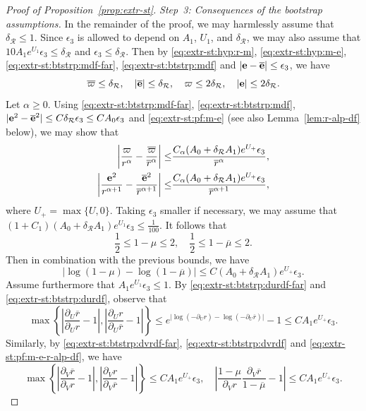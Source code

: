 \documentclass[10pt, reqno]{amsart}
\theoremstyle{definition}
\theoremstyle{remark}
\theoremstyle{conjecture}
\numberwithin{equation}{section}
\newcommand{\abs}[1]{\vert#1\vert}
\newcommand{\set}[1]{\{#1\}}
\newcommand{\rd}{\partial}
\newcommand{\0}{\emptyset}
\newcommand{\alp}{\alpha}
\newcommand{\dlt}{\delta}
\newcommand{\eps}{\epsilon}
\newcommand{\bfe}{{\bf e}}
\newcommand{\calR}{\mathcal R}
\newcommand{\pfstep}[1]{\vspace{.5em} {\it \noindent #1.}}
\newcommand{\e}{\bfe}							%
\newcommand{\rbg}{\overline{r}}					%
\newcommand{\varpibg}{\overline{\varpi}}				%
\newcommand{\mubg}{\overline{\mu}}				%
\newcommand{\ebg}{\overline{\e}}					%
\newcommand{\Abs}[1]{\left\vert #1 \right\vert}
\begin{document}
\begin{proof}[Proof of Proposition~\ref{prop:extr-st}]
\pfstep{Step~3: Consequences of the bootstrap assumptions}
In the remainder of the proof, we may harmlessly assume that $\dlt_{\calR} \leq 1$. Since $\eps_{3}$ is allowed to depend on $A_{1}$, $U_{1}$, and $\dlt_{\calR}$, we may also assume that $10 A_{1} e^{U_{1}} \eps_{3} \leq \dlt_{\calR}$ and $\eps_{3} \leq \dlt_{\calR}$. Then by \eqref{eq:extr-st:hyp:r-m}, \eqref{eq:extr-st:hyp:m-e}, \eqref{eq:extr-st:btstrp:mdf-far}, \eqref{eq:extr-st:btstrp:mdf} and $\abs{\e - \ebg} \leq \eps_{3}$, we have
\begin{equation} \label{eq:extr-st:pf:m-e}
	\varpibg \leq \dlt_{\calR}, \quad
	|\ebg| \leq \dlt_{\calR}, \quad
	\varpi \leq 2 \dlt_{\calR}, \quad
	|\e| \leq 2 \dlt_{\calR}.
\end{equation}
Let $\alp \geq 0$. Using \eqref{eq:extr-st:btstrp:mdf-far}, \eqref{eq:extr-st:btstrp:mdf}, $\abs{\e^{2} - \ebg^{2}} \leq C \dlt_{\calR} \eps_{3} \leq C A_{0} \eps_{3}$ and \eqref{eq:extr-st:pf:m-e} (see also Lemma~\ref{lem:r-alp-df} below), we may show that
\begin{align} \label{eq:extr-st:pf:m-e-r-alp-df}
	\Abs{\frac{\varpi}{r^{\alp}} - \frac{\varpibg}{\rbg^{\alp}}} \leq & \frac{C_{\alp} (A_{0} + \dlt_{\calR} A_{1}) e^{U_{+}}\eps_{3}}{\rbg^{\alp}}, \\
	\Abs{\frac{\e^{2}}{r^{\alp+1}} - \frac{\ebg^{2}}{\rbg^{\alp+1}}} \leq & \frac{C_{\alp} (A_{0} + \dlt_{\calR} A_{1}) e^{U_{+}}\eps_{3}}{\rbg^{\alp+1}},
\end{align}
where $U_{+} = \max \set{U, 0}$. Taking $\eps_{3}$ smaller if necessary, we may assume that $(1+C_{1}) (A_{0} + \dlt_{\calR} A_{1}) e^{U_{1}} \eps_{3} \leq \frac{1}{100}$. It follows that
\begin{equation} \label{eq:extr-st:pf:mu}
	\frac{1}{2} \leq 1-\mu \leq 2, \quad \frac{1}{2} \leq 1-\mubg \leq 2.
\end{equation}
Then in combination with the previous bounds, we have
\begin{equation} \label{eq:extr-st:pf:mu-df}
	\Abs{\log (1-\mu) - \log (1-\mubg)} \leq C (A_{0} + \dlt_{\calR} A_{1}) e^{U_{+}}\eps_{3}.
\end{equation}
Assume furthermore that $A_{1} e^{U_{1}} \eps_{3} \leq 1$. By \eqref{eq:extr-st:btstrp:durdf-far} and \eqref{eq:extr-st:btstrp:durdf}, observe that
\begin{equation} \label{eq:dur-df}
	\max \left\{ \Abs{\frac{\rd_{U} \rbg}{\rd_{U} r} - 1}, \Abs{\frac{\rd_{U} r}{\rd_{U} \rbg} - 1} \right\}
	\leq e^{\abs{\log (-\rd_{U} r) - \log(-\rd_{U} \rbg)}} - 1
	\leq C A_{1} e^{U_{+}} \eps_{3}.
\end{equation}
Similarly, by \eqref{eq:extr-st:btstrp:dvrdf-far}, \eqref{eq:extr-st:btstrp:dvrdf} and \eqref{eq:extr-st:pf:m-e-r-alp-df}, we have
\begin{equation} \label{eq:extr-st:pf:dvr-kpp-df}
\max \left\{ \Abs{\frac{\rd_{V} \rbg}{\rd_{V} r} - 1}, \Abs{\frac{\rd_{V} r}{\rd_{V} \rbg} - 1} \right\}
\leq C A_{1} e^{U_{+}} \eps_{3}, \quad
\Abs{\frac{1-\mu}{\rd_{V} r} \frac{\rd_{V} \rbg}{1-\mubg} - 1} 
\leq C A_{1} e^{U_{+}} \eps_{3}.
\end{equation}
 

\end{proof}
\end{document}
